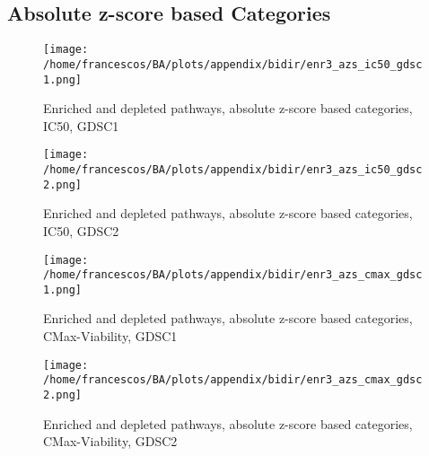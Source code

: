 \subsection{Absolute z-score based Categories}
\begin{figure}[H]
    \centering
    \texttt{[image: /home/francescos/BA/plots/appendix/bidir/enr3\_azs\_ic50\_gdsc1.png]}
    \caption{Enriched and depleted pathways, absolute z-score based categories, IC50, GDSC1}
\end{figure}
\begin{figure}[H]
    \centering
    \texttt{[image: /home/francescos/BA/plots/appendix/bidir/enr3\_azs\_ic50\_gdsc2.png]}
    \caption{Enriched and depleted pathways, absolute z-score based categories, IC50, GDSC2}
\end{figure}
\begin{figure}[H]
    \centering
    \texttt{[image: /home/francescos/BA/plots/appendix/bidir/enr3\_azs\_cmax\_gdsc1.png]}
    \caption{Enriched and depleted pathways, absolute z-score based categories, CMax-Viability, GDSC1}
\end{figure}
\begin{figure}[H]
    \centering
    \texttt{[image: /home/francescos/BA/plots/appendix/bidir/enr3\_azs\_cmax\_gdsc2.png]}
    \caption{Enriched and depleted pathways, absolute z-score based categories, CMax-Viability, GDSC2}
\end{figure}
